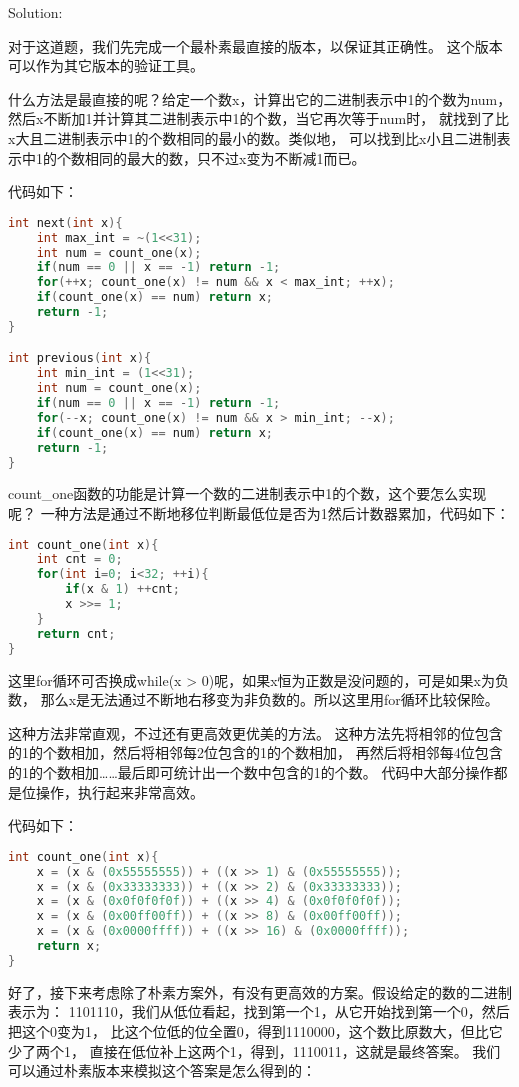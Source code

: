 \begin{description}
Solution:

对于这道题，我们先完成一个最朴素最直接的版本，以保证其正确性。 这个版本可以作为其它版本的验证工具。

什么方法是最直接的呢？给定一个数x，计算出它的二进制表示中1的个数为num， 然后x不断加1并计算其二进制表示中1的个数，当它再次等于num时， 就找到了比x大且二进制表示中1的个数相同的最小的数。类似地， 可以找到比x小且二进制表示中1的个数相同的最大的数，只不过x变为不断减1而已。

代码如下：
\begin{lstlisting}[language=C++]
int next(int x){
    int max_int = ~(1<<31);
    int num = count_one(x);
    if(num == 0 || x == -1) return -1;
    for(++x; count_one(x) != num && x < max_int; ++x);
    if(count_one(x) == num) return x;
    return -1;    
}

int previous(int x){
    int min_int = (1<<31);
    int num = count_one(x);
    if(num == 0 || x == -1) return -1;
    for(--x; count_one(x) != num && x > min_int; --x);
    if(count_one(x) == num) return x;
    return -1; 
}
\end{lstlisting}

count\_one函数的功能是计算一个数的二进制表示中1的个数，这个要怎么实现呢？ 一种方法是通过不断地移位判断最低位是否为1然后计数器累加，代码如下：
\begin{lstlisting}[language=C++]
int count_one(int x){
    int cnt = 0;
    for(int i=0; i<32; ++i){
        if(x & 1) ++cnt;
        x >>= 1;
    }
    return cnt;
}
\end{lstlisting}

这里for循环可否换成while(x > 0)呢，如果x恒为正数是没问题的，可是如果x为负数， 那么x是无法通过不断地右移变为非负数的。所以这里用for循环比较保险。

这种方法非常直观，不过还有更高效更优美的方法。 这种方法先将相邻的位包含的1的个数相加，然后将相邻每2位包含的1的个数相加， 再然后将相邻每4位包含的1的个数相加……最后即可统计出一个数中包含的1的个数。 代码中大部分操作都是位操作，执行起来非常高效。

代码如下：
\begin{lstlisting}[language=C++]
int count_one(int x){
    x = (x & (0x55555555)) + ((x >> 1) & (0x55555555));
    x = (x & (0x33333333)) + ((x >> 2) & (0x33333333));
    x = (x & (0x0f0f0f0f)) + ((x >> 4) & (0x0f0f0f0f));
    x = (x & (0x00ff00ff)) + ((x >> 8) & (0x00ff00ff));
    x = (x & (0x0000ffff)) + ((x >> 16) & (0x0000ffff));
    return x;
}
\end{lstlisting}

好了，接下来考虑除了朴素方案外，有没有更高效的方案。假设给定的数的二进制表示为： 1101110，我们从低位看起，找到第一个1，从它开始找到第一个0，然后把这个0变为1， 比这个位低的位全置0，得到1110000，这个数比原数大，但比它少了两个1， 直接在低位补上这两个1，得到，1110011，这就是最终答案。 我们可以通过朴素版本来模拟这个答案是怎么得到的：


\end{description}
